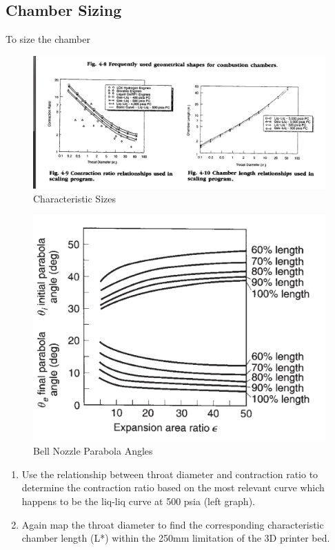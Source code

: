 \subsection{Chamber Sizing}
To size the chamber
\begin{figure}[H]
    \centering
    \includegraphics[width=0.75\linewidth]{Images/lstar.png}
    \caption{Characteristic Sizes}
    \label{fig:enter-label}
\end{figure}


\begin{figure}[H]
    \centering
    \includegraphics[width=0.75\linewidth]{nozzleshape.png}
    \caption{Bell Nozzle Parabola Angles}
    \label{fig:enter-label}
\end{figure}
     \begin{enumerate}

     
\item Use the relationship between throat diameter and contraction ratio to determine the contraction ratio based on the most relevant curve which happens to be the liq-liq curve at 500 psia (left graph).
  
\item Again map the throat diameter to find the corresponding characteristic chamber length (L*) within the 250mm limitation of the 3D printer bed.   


\end{enumerate}


